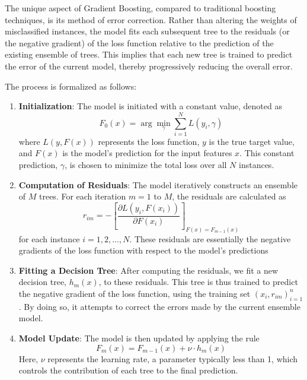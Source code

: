 The unique aspect of Gradient Boosting, compared to traditional boosting techniques, is its method of error correction. Rather than altering the weights of misclassified instances, the model fits each subsequent tree to the residuals (or the negative gradient) of the loss function relative to the prediction of the existing ensemble of trees. This implies that each new tree is trained to predict the error of the current model, thereby progressively reducing the overall error.

The process is formalized as follows:

\begin{enumerate}
    \item \textbf{Initialization}: The model is initiated with a constant value, denoted as 
    \begin{equation*}
        F_0(x) = \arg\min_{\gamma} \sum_{i=1}^{N} L(y_i, \gamma)    
    \end{equation*}
    where $L(y, F(x))$ represents the loss function, $y$ is the true target value, and $F(x)$ is the model's prediction for the input features $x$. This constant prediction, $\gamma$, is chosen to minimize the total loss over all $N$ instances.

    \item \textbf{Computation of Residuals}: The model iteratively constructs an ensemble of $M$ trees. For each iteration $m=1$ to $M$, the residuals are calculated as 
    \begin{equation*}
        r_{im} = - \left[\frac{\partial L(y_i, F(x_i))}{\partial F(x_i)}\right]_{F(x)=F_{m-1}(x)}
    \end{equation*}
     for each instance $i=1,2,...,N$. These residuals are essentially the negative gradients of the loss function with respect to the model's predictions
     
   \item \textbf{Fitting a Decision Tree}: After computing the residuals, we fit a new decision tree, $h_m(x)$, to these residuals. This tree is thus trained to predict the negative gradient of the loss function, using the training set ${(x_i, r_{im})}_{i=1}^n$. By doing so, it attempts to correct the errors made by the current ensemble model.
	
    \item \textbf{Model Update}: The model is then updated by applying the rule
    \begin{equation*}
        F_m(x) = F_{m-1}(x) + \nu \cdot h_m(x)
    \end{equation*}
    Here, $\nu$ represents the learning rate, a parameter typically less than 1, which controls the contribution of each tree to the final prediction.	


\end{enumerate}
